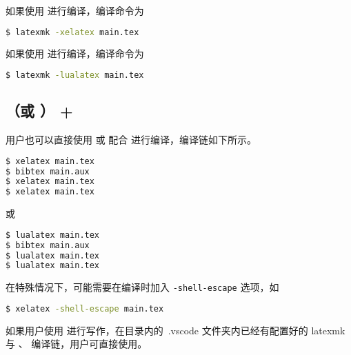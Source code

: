 如果使用  进行编译，编译命令为
\lstset{basicstyle=\ttfamily, breaklines=true}
\begin{lstlisting}[language=bash]
$ latexmk -xelatex main.tex
\end{lstlisting}

如果使用  进行编译，编译命令为
\lstset{basicstyle=\ttfamily, breaklines=true}
\begin{lstlisting}[language=bash]
$ latexmk -lualatex main.tex
\end{lstlisting}

\subsection{（或 ） + }
用户也可以直接使用  或  配合  进行编译，编译链如下所示。
\begin{lstlisting}[language=bash]
$ xelatex main.tex  
$ bibtex main.aux
$ xelatex main.tex
$ xelatex main.tex
\end{lstlisting}
或
\begin{lstlisting}[language=bash]
$ lualatex main.tex  
$ bibtex main.aux
$ lualatex main.tex
$ lualatex main.tex
\end{lstlisting}

在特殊情况下，可能需要在编译时加入 \verb|-shell-escape| 选项，如
\begin{lstlisting}[language=bash]
$ xelatex -shell-escape main.tex 
\end{lstlisting}

如果用户使用  进行写作，在目录内的\ .vscode 文件夹内已经有配置好的 latexmk 与 、 编译链，用户可直接使用。